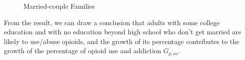 \documentclass[12pt]{article}
\begin{document}
\begin{figure}[h]
\centering
{}
\caption{Married-couple Families}
\end{figure}

From the result, we can draw a conclusion that adults with some college education and with no education beyond high school who don't get married are likely to use/abuse opioids, and the growth of its percentage contributes to the  growth of the percentage of opioid use and addiction $G_{p,os}$.
\end{document}
